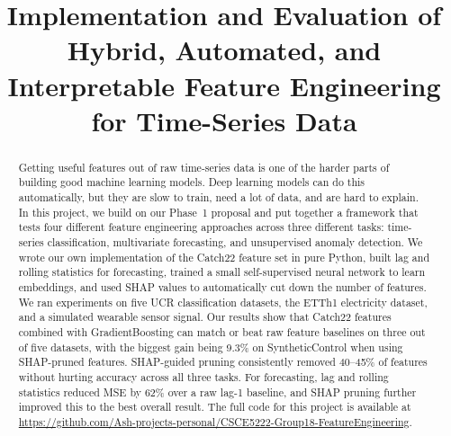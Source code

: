 \documentclass[10pt,conference]{IEEEtran}
\begin{document}
\title{Implementation and Evaluation of Hybrid, Automated, and Interpretable Feature Engineering for Time-Series Data}

\author{
  \and
}

\maketitle

\begin{abstract}
Getting useful features out of raw time-series data is one of the harder parts of building good machine learning models. Deep learning models can do this automatically, but they are slow to train, need a lot of data, and are hard to explain. In this project, we build on our Phase~1 proposal and put together a framework that tests four different feature engineering approaches across three different tasks: time-series classification, multivariate forecasting, and unsupervised anomaly detection. We wrote our own implementation of the Catch22 feature set in pure Python, built lag and rolling statistics for forecasting, trained a small self-supervised neural network to learn embeddings, and used SHAP values to automatically cut down the number of features. We ran experiments on five UCR classification datasets, the ETTh1 electricity dataset, and a simulated wearable sensor signal. Our results show that Catch22 features combined with GradientBoosting can match or beat raw feature baselines on three out of five datasets, with the biggest gain being 9.3\% on SyntheticControl when using SHAP-pruned features. SHAP-guided pruning consistently removed 40--45\% of features without hurting accuracy across all three tasks. For forecasting, lag and rolling statistics reduced MSE by 62\% over a raw lag-1 baseline, and SHAP pruning further improved this to the best overall result. The full code for this project is available at \url{https://github.com/Ash-projects-personal/CSCE5222-Group18-FeatureEngineering}.
\end{abstract}
\end{document}
